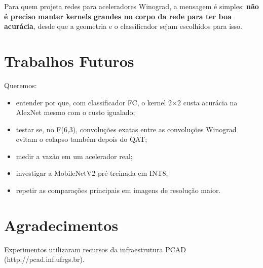 \documentclass[conference]{IEEEtran}
\newcommand{\by}{\ensuremath{\times}}
\begin{document}
Para quem projeta redes para aceleradores Winograd, a mensagem é simples: \textbf{não é preciso manter kernels grandes no corpo da rede para ter boa acurácia}, desde que a geometria e o classificador sejam escolhidos para isso.

\section{Trabalhos Futuros}

Queremos:
\begin{itemize}
\item entender por que, com classificador FC, o kernel 2\by2 custa acurácia na AlexNet mesmo com o custo igualado;
\item testar se, no F(6,3), convoluções exatas entre as convoluções Winograd evitam o colapso também depois do QAT;
\item medir a vazão em um acelerador real;
\item investigar a MobileNetV2 pré-treinada em INT8;
\item repetir as comparações principais em imagens de resolução maior.
\end{itemize}

\section*{Agradecimentos}
Experimentos utilizaram recursos da infraestrutura PCAD (http://pcad.inf.ufrgs.br).
\end{document}
